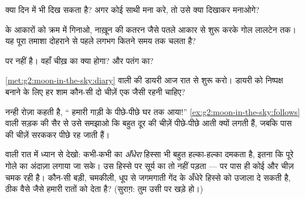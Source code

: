 \begin{exercise}[$\star$]\label{exo:g2:moon-in-the-sky:5}
क्या  दिन में भी दिख सकता है? अगर कोई साथी मना करे, तो उसे
क्या दिखाकर मनाओगे?
\end{exercise}

\begin{exercise}[$\star$]\label{exo:g2:moon-in-the-sky:6}
 के आकारों को क्रम में गिनाओ, नाख़ून की कतरन जैसे पतले आकार से
शुरू करके गोल लालटेन तक। यह पूरा तमाशा दोहराने से पहले लगभग कितने
समय तक चलता है?
\end{exercise}

\begin{exercise}[$\star$]\label{exo:g2:moon-in-the-sky:7}
 पर  नहीं है। वहाँ चीख़ का क्या होगा? और पतंग का?
\end{exercise}

\begin{exercise}[$\star$]\label{exo:g2:moon-in-the-sky:8}
\cref{met:g2:moon-in-the-sky:diary} वाली  की डायरी आज रात से
शुरू करो। डायरी को निष्पक्ष बनाने के लिए हर शाम कौन-सी दो चीज़ें एक
जैसी रहनी चाहिए?
\end{exercise}

\begin{exercise}[$\star\star$]\label{exo:g2:moon-in-the-sky:9}
नन्ही रोज़ा कहती है, `` हमारी गाड़ी के पीछे-पीछे घर तक आया!''
\cref{ex:g2:moon-in-the-sky:follows} वाली सड़क की सैर से उसे समझाओ कि
बहुत दूर की चीज़ें पीछे-पीछे आती क्यों लगती हैं, जबकि पास की चीज़ें
सरककर पीछे रह जाती हैं।
\end{exercise}

\begin{exercise}[$\star\star$]\label{exo:g2:moon-in-the-sky:10}
 वाली रात में ध्यान से देखो: कभी-कभी  का
\emph{अँधेरा} हिस्सा भी बहुत हल्का-हल्का दमकता है, इतना कि पूरे गोले
का अंदाज़ा लगाया जा सके। उस हिस्से पर सूर्य का  तो नहीं पड़ता
--- पर पास ही कोई और चीज़ चमक रही है। कौन-सी बड़ी, चमकीली, धूप से
जगमगाती गेंद  के अँधेरे हिस्से को उजाला दे सकती है, ठीक वैसे
जैसे  हमारी रातों को देता है? (सुराग़: तुम उसी पर खड़े हो।)
\end{exercise}
